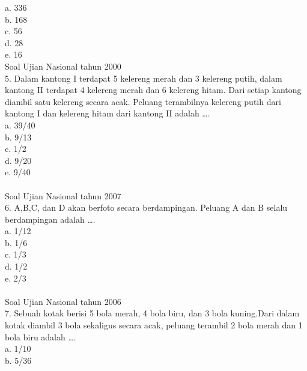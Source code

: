 \documentclass[11pt,fleqn]{book} %
\begin{document}
a. 336\\

b. 168\\

c. 56\\

d. 28\\

e. 16\\

Soal Ujian Nasional tahun 2000\\
5. Dalam kantong I terdapat 5 kelereng merah dan 3 kelereng putih, dalam kantong II terdapat 4 kelereng merah dan 6 kelereng hitam. Dari setiap kantong diambil satu kelereng secara acak. Peluang terambilnya kelereng putih dari kantong I dan kelereng hitam dari kantong II adalah ….\\

a. 39/40\\

b. 9/13\\

c. 1/2\\

d. 9/20\\

e. 9/40\\
\\

Soal Ujian Nasional tahun 2007\\
6. A,B,C, dan D akan berfoto secara berdampingan. Peluang A dan B selalu berdampingan adalah ….\\

a. 1/12\\

b. 1/6\\

c. 1/3\\

d. 1/2\\

e. 2/3\\
\\

Soal Ujian Nasional tahun 2006\\
7. Sebuah kotak berisi 5 bola merah, 4 bola biru, dan 3 bola kuning.Dari dalam kotak diambil 3 bola sekaligus secara acak, peluang terambil 2 bola merah dan 1 bola biru adalah ….\\

a. 1/10\\

b. 5/36\\
\end{document}
